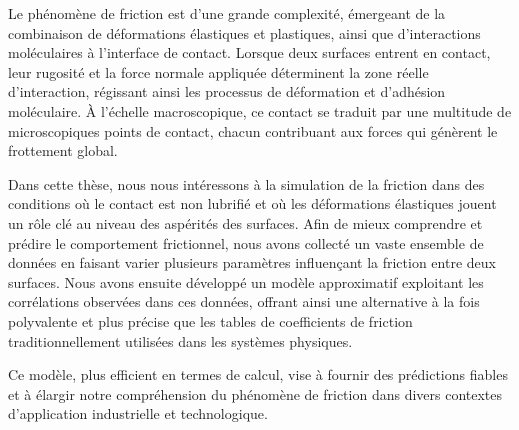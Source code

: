 \begin{avantpropos}

    Le phénomène de friction est d'une grande complexité, émergeant de la combinaison de déformations élastiques et plastiques, ainsi que d'interactions moléculaires à l'interface de contact. Lorsque deux surfaces entrent en contact, leur rugosité et la force normale appliquée déterminent la zone réelle d'interaction, régissant ainsi les processus de déformation et d'adhésion moléculaire. À l'échelle macroscopique, ce contact se traduit par une multitude de microscopiques points de contact, chacun contribuant aux forces qui génèrent le frottement global.
    
    Dans cette thèse, nous nous intéressons à la simulation de la friction dans des conditions où le contact est non lubrifié et où les déformations élastiques jouent un rôle clé au niveau des aspérités des surfaces. Afin de mieux comprendre et prédire le comportement frictionnel, nous avons collecté un vaste ensemble de données en faisant varier plusieurs paramètres influençant la friction entre deux surfaces. Nous avons ensuite développé un modèle approximatif exploitant les corrélations observées dans ces données, offrant ainsi une alternative à la fois polyvalente et plus précise que les tables de coefficients de friction traditionnellement utilisées dans les systèmes physiques.
    
    Ce modèle, plus efficient en termes de calcul, vise à fournir des prédictions fiables et à élargir notre compréhension du phénomène de friction dans divers contextes d'application industrielle et technologique.
    
    \end{avantpropos}
